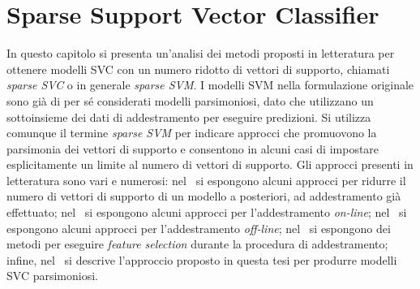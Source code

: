 \chapter{Sparse Support Vector Classifier}\label{chap:sparse_svc}
In questo capitolo si presenta un'analisi dei metodi proposti in letteratura per ottenere modelli SVC con un numero ridotto di vettori di supporto, chiamati \emph{sparse SVC} o in generale \emph{sparse SVM}.
I modelli SVM nella formulazione originale sono già di per sé considerati modelli parsimoniosi, dato che utilizzano un sottoinsieme dei dati di addestramento per eseguire predizioni. 
Si utilizza comunque il termine \emph{sparse SVM} per indicare approcci che promuovono la parsimonia dei vettori di supporto e consentono in alcuni casi di impostare esplicitamente un limite al numero di vettori di supporto. 
Gli approcci presenti in letteratura sono vari e numerosi:
nel~ si espongono alcuni approcci per ridurre il numero di vettori di supporto di un modello a posteriori, ad addestramento già effettuato; nel~ si espongono alcuni approcci per l'addestramento \emph{on-line}; nel~ si espongono alcuni approcci per l'addestramento \emph{off-line}; nel~ si espongono dei metodi per eseguire \emph{feature selection} durante la procedura di addestramento; infine, nel~ si descrive l'approccio proposto in questa tesi per produrre modelli SVC parsimoniosi.

